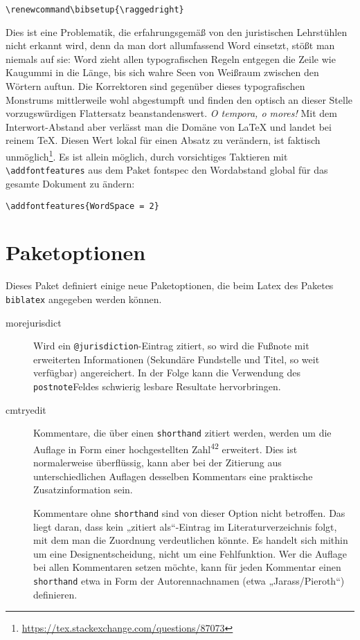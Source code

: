 \documentclass[11pt,a4paper,DIV=calc,draft]{scrartcl}
\newcommand\software[1]{\textsf{#1}}
\renewcommand\bibsetup{\raggedright}
\begin{document}
\begin{verbatim}
\renewcommand\bibsetup{\raggedright}
\end{verbatim}

Dies ist eine Problematik, die erfahrungsgemäß von den juristischen
Lehrstühlen nicht erkannt wird, denn da man dort allumfassend
\software{Word} einsetzt, stößt man niemals auf sie: \software{Word}
zieht allen typografischen Regeln entgegen die Zeile wie Kaugummi in
die Länge, bis sich wahre Seen von Weißraum zwischen den Wörtern
auftun. Die Korrektoren sind gegenüber dieses typografischen Monstrums
mittlerweile wohl abgestumpft und finden den optisch an dieser Stelle
vorzugswürdigen Flattersatz beanstandenswert. \emph{O tempora, o
  mores!} Mit dem Interwort-Abstand aber verlässt man die Domäne von
\LaTeX{} und landet bei reinem \TeX{}. Diesen Wert lokal für einen
Absatz zu verändern, ist faktisch
unmöglich\footnote{\url{https://tex.stackexchange.com/questions/87073}}. Es
ist allein möglich, durch vorsichtiges Taktieren mit
\verb+\addfontfeatures+ aus dem Paket \software{fontspec} den
Wordabstand global für das gesamte Dokument zu ändern:

\begin{verbatim}
\addfontfeatures{WordSpace = 2}
\end{verbatim}

\section{Paketoptionen}\label{sec:optionen}

Dieses Paket definiert einige neue Paketoptionen, die beim Latex des
Paketes \verb+biblatex+ angegeben werden können.

\begin{description}
\item[morejurisdict] Wird ein \verb+@jurisdiction+-Eintrag zitiert, so
  wird die Fußnote mit erweiterten Informationen (Sekundäre Fundstelle
  und Titel, so weit verfügbar) angereichert. In der Folge kann die
  Verwendung des \verb+postnote+Feldes schwierig lesbare Resultate
  hervorbringen.
\item[cmtryedit] Kommentare, die über einen \verb+shorthand+ zitiert
  werden, werden um die Auflage in Form einer hochgestellten
  Zahl\textsuperscript{42} erweitert. Dies ist normalerweise
  überflüssig, kann aber bei der Zitierung aus unterschiedlichen
  Auflagen desselben Kommentars eine praktische Zusatzinformation
  sein.

  Kommentare ohne \verb+shorthand+ sind von dieser Option nicht
  betroffen. Das liegt daran, dass kein „zitiert als“-Eintrag im
  Literaturverzeichnis folgt, mit dem man die Zuordnung verdeutlichen
  könnte. Es handelt sich mithin um eine Designentscheidung, nicht um
  eine Fehlfunktion. Wer die Auflage bei allen Kommentaren setzen
  möchte, kann für jeden Kommentar einen \verb+shorthand+ etwa in Form
  der Autorennachnamen (etwa „Jarass/Pieroth“) definieren.
\end{description}
\end{document}
